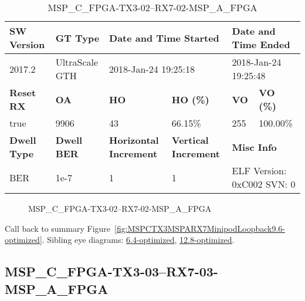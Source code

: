 \begin{table}[h]
\centering
\caption{MSP\_C\_FPGA-TX3-02--RX7-02-MSP\_A\_FPGA}
\label{tab:MSPCFPGATX302RX702MSPAFPGA9.6-optimized}
\begin{tabular}{@{}|l|l|l|l|l|l|@{}}
\toprule
\textbf{SW Version}                & \textbf{GT Type}   & \multicolumn{2}{l|}{\textbf{Date and Time Started}}            & \multicolumn{2}{l|}{\textbf{Date and Time Ended}}        \\ \midrule
2017.2                       & UltraScale GTH          & \multicolumn{2}{l|}{2018-Jan-24 19:25:18}                   & \multicolumn{2}{l|}{2018-Jan-24 19:25:48}               \\ \midrule
\textbf{Reset RX}                  & \textbf{OA} & \textbf{HO}   & \textbf{HO (\%)} & \textbf{VO} & \textbf{VO (\%)} \\ \midrule
true & 9906        & 43          & 66.15\%        & 255        & 100.00\%       \\ \midrule
\textbf{Dwell Type}                & \textbf{Dwell BER} & \textbf{Horizontal Increment} & \textbf{Vertical Increment}    & \multicolumn{2}{l|}{\textbf{Misc Info}}                  \\ \midrule
BER                            & 1e-7        & 1        & 1           & \multicolumn{2}{l|}{ELF Version: 0xC002 SVN: 0}                         \\ \bottomrule
\end{tabular}
\end{table}

\begin{figure}[h]
\caption{MSP\_C\_FPGA-TX3-02--RX7-02-MSP\_A\_FPGA} \label{fig:MSPCFPGATX302RX702MSPAFPGA9.6-optimized}
\end{figure}

Call back to summary Figure~\ref{fig:MSPCTX3MSPARX7MinipodLoopback9.6-optimized}.
Sibling eye diagrams: \hyperref[sec:MSPCFPGATX302RX702MSPAFPGA6.4-optimized]{6.4-optimized}, \hyperref[sec:MSPCFPGATX302RX702MSPAFPGA12.8-optimized]{12.8-optimized}.

\clearpage
\newpage


\subsection{MSP\_C\_FPGA-TX3-03--RX7-03-MSP\_A\_FPGA}\label{sec:MSPCFPGATX303RX703MSPAFPGA9.6-optimized}

